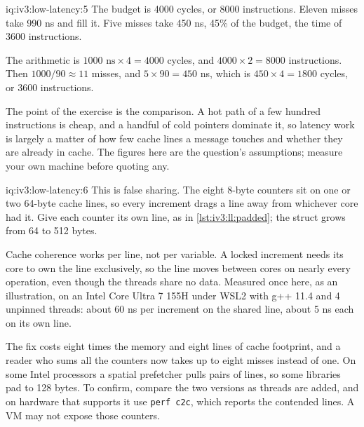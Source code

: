 \begin{solution}{iq:iv3:low-latency:5}
The budget is 4000 cycles, or 8000 instructions. Eleven misses take 990 ns and fill it. Five misses take 450 ns, 45\% of the budget, the time of 3600 instructions.

The arithmetic is $1000\text{ ns} \times 4 = 4000$ cycles, and $4000 \times 2 = 8000$ instructions. Then $1000 / 90 \approx 11$ misses, and $5 \times 90 = 450$ ns, which is $450 \times 4 = 1800$ cycles, or 3600 instructions.

The point of the exercise is the comparison. A hot path of a few hundred instructions is cheap, and a handful of cold pointers dominate it, so latency work is largely a matter of how few cache lines a message touches and whether they are already in cache. The figures here are the question's assumptions; measure your own machine before quoting any.

\end{solution}

\begin{solution}{iq:iv3:low-latency:6}
This is false sharing. The eight 8-byte counters sit on one or two 64-byte cache lines, so every increment drags a line away from whichever core had it. Give each counter its own line, as in \cref{lst:iv3:ll:padded}; the struct grows from 64 to 512 bytes.
\label{lst:iv3:ll:padded}

Cache coherence works per line, not per variable. A locked increment needs its core to own the line exclusively, so the line moves between cores on nearly every operation, even though the threads share no data. Measured once here, as an illustration, on an Intel Core Ultra 7 155H under WSL2 with g++ 11.4 and 4 unpinned threads: about 60 ns per increment on the shared line, about 5 ns each on its own line.

The fix costs eight times the memory and eight lines of cache footprint, and a reader who sums all the counters now takes up to eight misses instead of one. On some Intel processors a spatial prefetcher pulls pairs of lines, so some libraries pad to 128 bytes. To confirm, compare the two versions as threads are added, and on hardware that supports it use \texttt{perf c2c}, which reports the contended lines. A VM may not expose those counters.

\end{solution}

